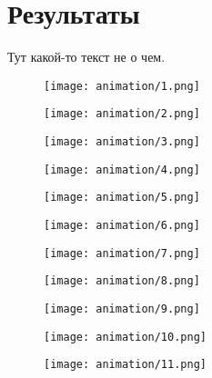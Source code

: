 \section{Результаты}

Тут какой-то текст не о чем.

\begin{figure}
  \hfill
  \begin{minipage}{0.327\textwidth}
    \centering
    \texttt{[image: animation/1.png]}
  \end{minipage}
  \begin{minipage}{0.327\textwidth}
    \centering
    \texttt{[image: animation/2.png]}
  \end{minipage}
  \begin{minipage}{0.327\textwidth}
    \centering
    \texttt{[image: animation/3.png]}
  \end{minipage}
  \vfill
  \hfill
  \begin{minipage}{0.327\textwidth}
    \centering
    \texttt{[image: animation/4.png]}
  \end{minipage}
  \begin{minipage}{0.327\textwidth}
    \centering
    \texttt{[image: animation/5.png]}
  \end{minipage}
  \begin{minipage}{0.327\textwidth}
    \centering
    \texttt{[image: animation/6.png]}
  \end{minipage}
  \vfill
  \hfill
  \begin{minipage}{0.327\textwidth}
    \centering
    \texttt{[image: animation/7.png]}
  \end{minipage}
  \begin{minipage}{0.327\textwidth}
    \centering
    \texttt{[image: animation/8.png]}
  \end{minipage}
  \begin{minipage}{0.327\textwidth}
    \centering
    \texttt{[image: animation/9.png]}
  \end{minipage}
  \vfill
  \hfill
  \begin{minipage}{0.327\textwidth}
    \centering
    \texttt{[image: animation/10.png]}
  \end{minipage}
  \begin{minipage}{0.327\textwidth}
    \centering
    \texttt{[image: animation/11.png]}
  \end{minipage}

\end{figure}
